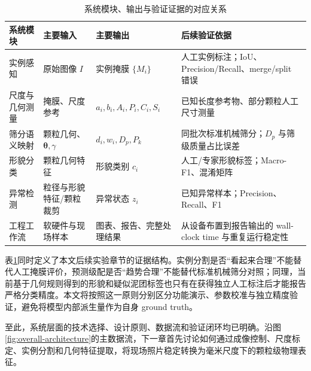 \begin{table}[htbp]
\centering
\caption{系统模块、输出与验证证据的对应关系}
\label{tab:module-validation}
\footnotesize
\renewcommand{\arraystretch}{1.18}
\begin{tabular}{>{\raggedright\arraybackslash}p{2.5cm}>{\raggedright\arraybackslash}p{3.0cm}>{\raggedright\arraybackslash}p{3.6cm}>{\raggedright\arraybackslash}p{4.6cm}}
\toprule
系统模块 & 主要输入 & 主要输出 & 后续验证依据 \\
\midrule
实例感知 & 原始图像 $I$ & 实例掩膜 $\{M_i\}$ & 人工实例标注；IoU、Precision/Recall、merge/split 错误 \\
尺度与几何测量 & 掩膜、尺度参考 & $a_i,b_i,A_i,P_i,C_i,S_i$ & 已知长度参考物、部分颗粒人工尺寸测量 \\
筛分语义映射 & 颗粒几何、$\boldsymbol{\theta},\gamma$ & $d_i,w_i,D_p,P_k$ & 同批次标准机械筛分；$D_p$ 与筛级质量占比误差 \\
形貌分类 & 颗粒几何特征 & 形貌类别 $c_i$ & 人工/专家形貌标签；Macro-F1、混淆矩阵 \\
异常检测 & 粒径与形貌特征/颗粒裁剪 & 异常状态 $z_i$ & 已知异常样本；Precision、Recall、F1 \\
工程工作流 & 软硬件与现场样本 & 图表、报告、完整处理结果 & 从设备布置到报告输出的 wall-clock time 与重复运行稳定性 \\
\bottomrule
\end{tabular}
\end{table}

表\ref{tab:module-validation}同时定义了本文后续实验章节的证据结构。实例分割是否“看起来合理”不能替代人工掩膜评价，预测级配是否“趋势合理”不能替代标准机械筛分对照；同理，当前基于几何规则得到的形貌和疑似泥团标签也只有在获得独立人工标注后才能报告严格分类精度。本文将按照这一原则分别区分功能演示、参数校准与独立精度验证，避免将模型内部派生量作为自身 ground truth。

至此，系统层面的技术选择、设计原则、数据流和验证闭环均已明确。沿图\ref{fig:overall-architecture}的主数据流，下一章首先讨论如何通过成像控制、尺度标定、实例分割和几何特征提取，将现场照片稳定转换为毫米尺度下的颗粒级物理表征。